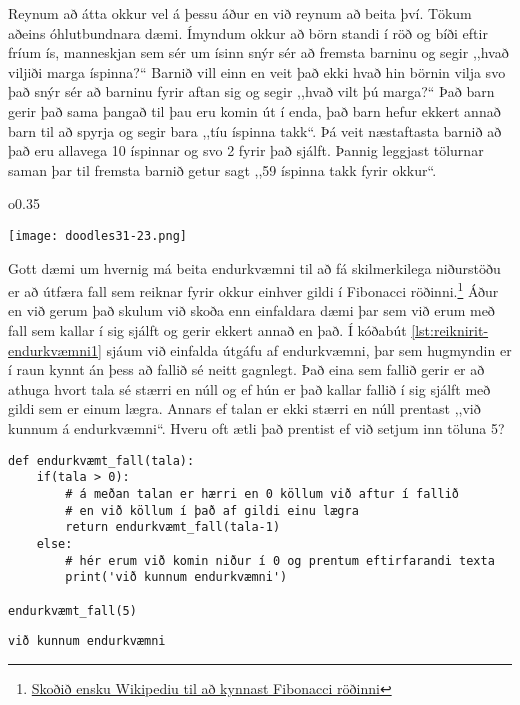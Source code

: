 Reynum að átta okkur vel á þessu áður en við reynum að beita því.
Tökum aðeins óhlutbundnara dæmi.
Ímyndum okkur að börn standi í röð og bíði eftir fríum ís, manneskjan sem sér um ísinn snýr sér að fremsta barninu og segir ,,hvað viljiði marga íspinna?“
Barnið vill einn en veit það ekki hvað hin börnin vilja svo það snýr sér að barninu fyrir aftan sig og segir ,,hvað vilt þú marga?“ 
Það barn gerir það sama þangað til þau eru komin út í enda, það barn hefur ekkert annað barn til að spyrja og segir bara ,,tíu íspinna takk“.
Þá veit næstaftasta barnið að það eru allavega 10 íspinnar og svo 2 fyrir það sjálft.
Þannig leggjast tölurnar saman þar til fremsta barnið getur sagt ,,59 íspinna takk fyrir okkur“.


\begin{wrapfigure}{o}{0.35\textwidth} %
	\begin{center}
		\texttt{[image: doodles31-23.png]}
	\end{center}
\end{wrapfigure}
Gott dæmi um hvernig má beita endurkvæmni til að fá skilmerkilega niðurstöðu er að útfæra fall sem reiknar fyrir okkur einhver gildi í Fibonacci röðinni.\footnote{\href{https://en.wikipedia.org/wiki/Fibonacci_number}{Skoðið ensku Wikipediu til að kynnast Fibonacci röðinni}}
Áður en við gerum það skulum við skoða enn einfaldara dæmi þar sem við erum með fall sem kallar í sig sjálft og gerir ekkert annað en það.
Í kóðabút \ref{lst:reiknirit-endurkvæmni1} sjáum við einfalda útgáfu af endurkvæmni, þar sem hugmyndin er í raun kynnt án þess að fallið sé neitt gagnlegt.
Það eina sem fallið gerir er að athuga hvort tala sé stærri en núll og ef hún er það kallar fallið í sig sjálft með gildi sem er einum lægra.
Annars ef talan er ekki stærri en núll prentast ,,við kunnum á endurkvæmni“.
Hveru oft ætli það prentist ef við setjum inn töluna 5?

\begin{lstlisting}[caption=Endurkvæmni - einfalt, label=lst:reiknirit-endurkvæmni1]
def endurkvæmt_fall(tala):
	if(tala > 0):
		# á meðan talan er hærri en 0 köllum við aftur í fallið
		# en við köllum í það af gildi einu lægra
		return endurkvæmt_fall(tala-1)
	else:
		# hér erum við komin niður í 0 og prentum eftirfarandi texta
		print('við kunnum endurkvæmni')
		
endurkvæmt_fall(5)
\end{lstlisting}
\lstset{style=uttak}
\begin{lstlisting}
við kunnum endurkvæmni
\end{lstlisting}
\lstset{style=venjulegt}

